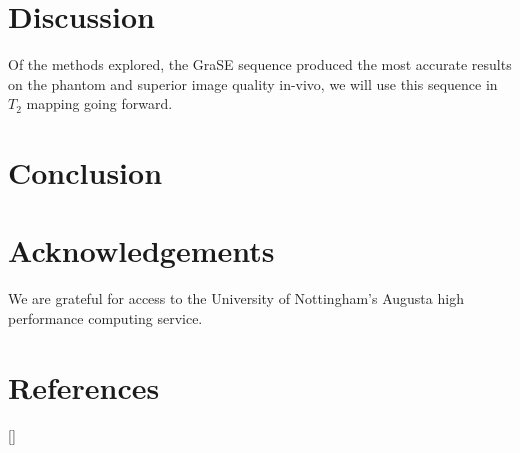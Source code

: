\section{Discussion}
Of the methods explored, the \ac{GraSE} sequence produced the most accurate results on the phantom and superior image quality in-vivo, we will use this sequence in $T_2$ mapping going forward.

\section{Conclusion}

\section{Acknowledgements}

We are grateful for access to the University of Nottingham's Augusta high performance computing service.

\newpage
\section{References}
[\refname]{}
\printbibliography